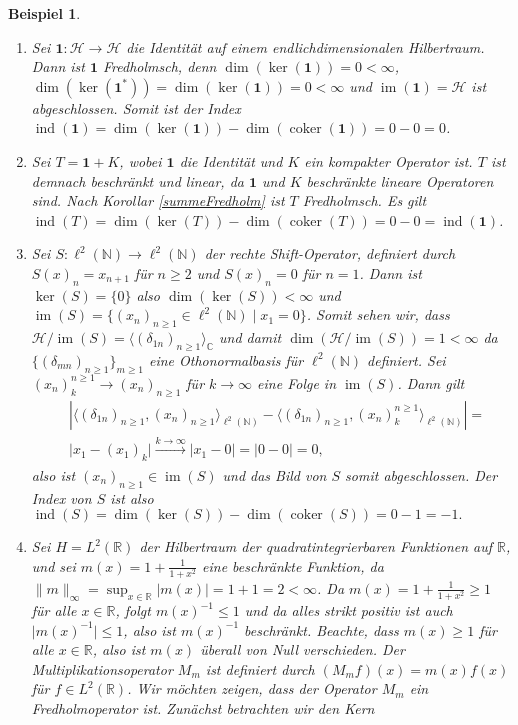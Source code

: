 \documentclass[11pt, hidelinks]{article}
\newcommand{\h}{\mathcal{H}}
\newcommand{\im}{\operatorname{im}}
\newcommand{\coker}{\operatorname{coker}}
\numberwithin{conj}{section}
\newtheorem{example}[conj]{Beispiel}
\begin{document}
\begin{example}\noindent
    \begin{enumerate}
        \item Sei $\mathbf{1}: \h \to \h$ die Identität auf einem endlichdimensionalen Hilbertraum. Dann ist $\mathbf{1}$ Fredholmsch, denn $\dim(\ker(\mathbf{1})) = 0 < \infty$, $\dim(\ker(\mathbf{1}^\ast)) = \dim(\ker(\mathbf{1})) = 0 < \infty$ und $\im(\mathbf{1}) = \h$ ist abgeschlossen. Somit ist der Index $\operatorname{ind}(\mathbf{1}) = \dim(\ker(\mathbf{1})) - \dim(\operatorname{coker}(\mathbf{1})) = 0 - 0 = 0$.
        \item Sei \( T = \mathbf{1} + K \), wobei \( \mathbf{1} \) die Identität und \( K \) ein kompakter Operator ist. \( T \) ist demnach beschränkt und linear, da \( \mathbf{1} \) und \( K \) beschränkte lineare Operatoren sind. Nach Korollar \ref{summeFredholm} ist $T$ Fredholmsch. Es gilt $\operatorname{ind}(T) = \dim(\ker(T)) - \dim(\coker(T)) = 0 - 0 = \operatorname{ind}(\mathbf{1})$.
        \item Sei $S: \ell^2(\mathbb{N}) \to \ell^2(\mathbb{N})$ der rechte Shift-Operator, definiert durch $S(x)_n = x_{n+1}$ für $n \geq 2$ und $S(x)_n = 0$ für $n=1$. Dann ist $\ker(S) = \{0\}$ also $\dim(\ker(S)) < \infty$ und $\im(S) = \{ (x_n)_{n \geq 1} \in \ell^2(\mathbb{N}) \; \vert \; x_1 = 0\}$. Somit sehen wir, dass $\h/\im(S) = \langle (\delta_{1n})_{n \geq 1} \rangle_{\mathbb{C}}$ und damit $\dim(\h/\im(S)) = 1 < \infty$ da $\{(\delta_{mn})_{n \geq 1}\}_{m \geq 1}$ eine Othonormalbasis für $\ell^2(\mathbb{N})$ definiert. Sei $(x_n)^{n \geq 1}_k \to (x_n)_{n \geq 1}$ für $k \to \infty$ eine Folge in $\im(S)$. Dann gilt
        \begin{align}
            &\left\vert \langle (\delta_{1n})_{n \geq 1}, (x_n)_{n \geq 1} \rangle_{\ell^2(\mathbb{N})} - \langle (\delta_{1n})_{n \geq 1}, (x_n)^{n \geq 1}_k \rangle_{\ell^2(\mathbb{N})} \right\vert = \nonumber\\
            & \vert x_1 - (x_1)_k \vert \nonumber \xrightarrow[]{k \to \infty} \vert x_1 - 0 \vert = \vert 0 - 0 \vert = 0,
        \end{align}
        also ist $(x_n)_{n \geq 1} \in \im(S)$ und das Bild von $S$ somit abgeschlossen. Der Index von \( S \) ist also $\operatorname{ind}(S) = \dim(\ker(S)) - \dim(\operatorname{coker}(S)) = 0 - 1 = -1.$
        \item Sei \( H = L^2(\mathbb{R}) \) der Hilbertraum der quadratintegrierbaren Funktionen auf \( \mathbb{R} \), und sei $m(x) = 1 + \frac{1}{1 + x^2}$ eine beschränkte Funktion, da $\|m\|_\infty = \sup_{x \in \mathbb{R}} |m(x)| = 1 + 1 = 2 < \infty$. Da \( m(x) = 1 + \frac{1}{1 + x^2} \geq 1 \) für alle \( x \in \mathbb{R} \), folgt \( m(x)^{-1} \leq 1 \) und da alles strikt positiv ist auch \( \vert m(x)^{-1} \vert \leq 1 \), also ist \( m(x)^{-1} \) beschränkt. Beachte, dass \( m(x) \geq 1 \) für alle \( x \in \mathbb{R} \), also ist \( m(x) \) überall von Null verschieden. Der Multiplikationsoperator \( M_m \) ist definiert durch $(M_m f)(x) = m(x) f(x)$ für $f \in L^2(\mathbb{R})$. Wir möchten zeigen, dass der Operator \( M_m \) ein Fredholmoperator ist. Zunächst betrachten wir den Kern

\end{enumerate}
\end{example}
\end{document}
